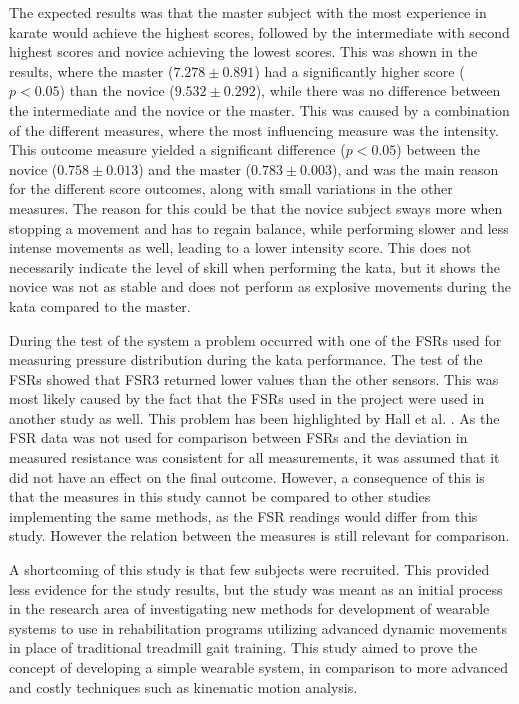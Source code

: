 
The expected results was that the master subject with the most experience in karate would achieve the highest scores, followed by the intermediate with second highest scores and novice achieving the lowest scores. This was shown in the results, where the master ($7.278 \pm 0.891$) had a significantly higher score ($p<0.05$) than the novice ($9.532 \pm 0.292$), while there was no difference between the intermediate and the novice or the master. This was caused by a combination of the different measures, where the most influencing measure was the intensity. This outcome measure yielded a significant difference ($p<0.05$) between the novice ($0.758 \pm 0.013$) and the master ($0.783 \pm 0.003$), and was the main reason for the different score outcomes, along with small variations in the other measures. The reason for this could be that the novice subject sways more when stopping a movement and has to regain balance, while performing slower and less intense movements as well, leading to a lower intensity score. This does not necessarily indicate the level of skill when performing the kata, but it shows the novice was not as stable and does not perform as explosive movements during the kata compared to the master.

During the test of the system a problem occurred with one of the FSRs used for measuring pressure distribution during the kata performance. The test of the FSRs showed that FSR3 returned lower values than the other sensors. This was most likely caused by the fact that the FSRs used in the project were used in another study as well. This problem has been highlighted by Hall et al. \cite{Hall2008}. As the FSR data was not used for comparison between FSRs and the deviation in measured resistance was consistent for all measurements, it was assumed that it did not have an effect on the final outcome. However, a consequence of this is that the measures in this study cannot be compared to other studies implementing the same methods, as the FSR readings would differ from this study. However the relation between the measures is still relevant for comparison.

A shortcoming of this study is that few subjects were recruited. This provided less evidence for the study results, but the study was meant as an initial process in the research area of investigating new methods for development of wearable systems to use in rehabilitation programs utilizing advanced dynamic movements in place of traditional treadmill gait training. This study aimed to prove the concept of developing a simple wearable system, in comparison to more advanced and costly techniques such as kinematic motion analysis. 

